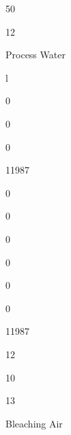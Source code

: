 \documentclass[a4paper,portrait,12pt]{article}
\begin{document}
50





12





\begin{flushleft}
Process Water
\end{flushleft}





\begin{flushleft}
l
\end{flushleft}





0





0





0





11987





0





0





0





0





0





0





11987





12





10





13





\begin{flushleft}
Bleaching Air
\end{flushleft}
\end{document}
